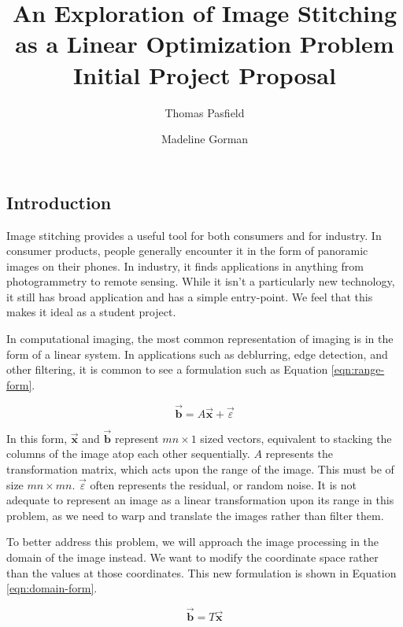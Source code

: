 \documentclass[11pt, letterpaper, notitlepage]{article}
\title{%
  An Exploration of Image Stitching as a Linear Optimization Problem\\
  \large \vspace{1em}\textbf{Initial Project Proposal}
}
\author{Thomas Pasfield}
\author{Madeline Gorman}
\affil{Embry-Riddle Aeronautical University, Daytona Beach, FL.}
\begin{document}
\maketitle


\begin{multicols}{2}
\section{Introduction}
Image stitching provides a useful tool for both consumers and for industry. In consumer products, people generally encounter it in the form of panoramic images on their phones. In industry, it finds applications in anything from photogrammetry to remote sensing. While it isn't a particularly new technology, it still has broad application and has a simple entry-point. We feel that this makes it ideal as a student project.

In computational imaging, the most common representation of imaging is in the form of a linear system. In applications such as deblurring, edge detection, and other filtering, it is common to see a formulation such as Equation \ref{eqn:range-form}.

\begin{equation}
  \label{eqn:range-form}
  \vec{\mathbf{b}} = A\vec{\mathbf{x}} + \vec{\varepsilon}
\end{equation}

In this form, $\vec{\mathbf{x}}$ and $\vec{\mathbf{b}}$ represent $mn\times 1$ sized vectors, equivalent to stacking the columns of the image atop each other sequentially. $A$ represents the transformation matrix, which acts upon the range of the image. This must be of size $mn\times mn$. $\vec{\varepsilon}$ often represents the residual, or random noise. It is not adequate to represent an image as a linear transformation upon its range in this problem, as we need to warp and translate the images rather than filter them.

To better address this problem, we will approach the image processing in the domain of the image instead. We want to modify the coordinate space rather than the values at those coordinates. This new formulation is shown in Equation \ref{eqn:domain-form}.

\begin{equation}
  \label{eqn:domain-form}
  \vec{\mathbf{b}} = T\vec{\mathbf{x}}
\end{equation}


\end{multicols}
\end{document}
